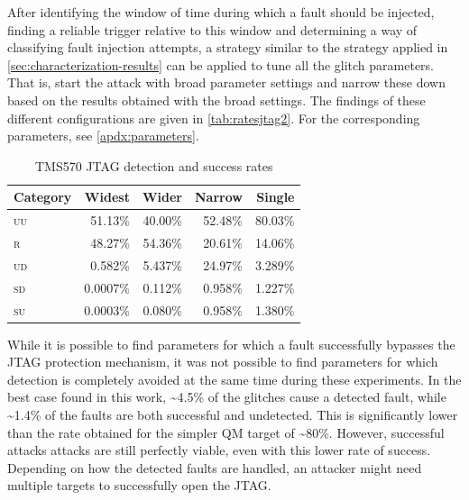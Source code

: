 \documentclass[10pt]{article}
\newcommand{\TI}{TMS570\xspace}
\newcommand{\jtag}{JTAG\xspace}
\newcommand{\UU}{\textsc{uu}\xspace}
\newcommand{\UD}{\textsc{ud}\xspace}
\newcommand{\SU}{\textsc{su}\xspace}
\newcommand{\SD}{\textsc{sd}\xspace}
\newcommand{\R}{\textsc{r}\xspace}
\begin{document}
    After identifying the window of time during which a fault should be injected, finding a reliable trigger relative to this window and determining a way of classifying fault injection attempts, a strategy similar to the strategy applied in \autoref{sec:characterization-results} can be applied to tune all the glitch parameters. That is, start the attack with broad parameter settings and narrow these down based on the results obtained with the broad settings. The findings of these different configurations are given in \autoref{tab:ratesjtag2}. For the corresponding parameters, see \autoref{apdx:parameters}. 

    \begin{table}[H]
    \centering
    \begin{tabular}{lrrrr}
      \toprule
      Category    & Widest & Wider & Narrow & Single \\
      \midrule                                                                                                                                   
        \UU    
        & 51.13\% & 40.00\% & 52.48\% & 80.03\% \\
        \R   
        & 48.27\% & 54.36\% & 20.61\% & 14.06\% \\
        \UD  
        & 0.582\% & 5.437\% & 24.97\% & 3.289\% \\
        \SD     
        & 0.0007\% & 0.112\%  & 0.958\%  & 1.227\%  \\
        \SU      
        & 0.0003\% & 0.080\%  & 0.958\%  & 1.380\%  \\
      \bottomrule
    \end{tabular}
    \caption{\TI \jtag detection and success rates} 
    \label{tab:ratesjtag2}
    \end{table}

    While it is possible to find parameters for which a fault successfully bypasses the JTAG protection mechanism, it was not possible to find parameters for which detection is completely avoided at the same time during these experiments. In the best case found in this work, \textasciitilde4.5\% of the glitches cause a detected fault, while \textasciitilde1.4\% of the faults are both successful and undetected. This is significantly lower than the rate obtained for the simpler QM target of  \textasciitilde80\%. However, successful attacks attacks are still perfectly viable, even with this lower rate of success. Depending on how the detected faults are handled, an attacker might need multiple targets to successfully open the JTAG. 
\end{document}
